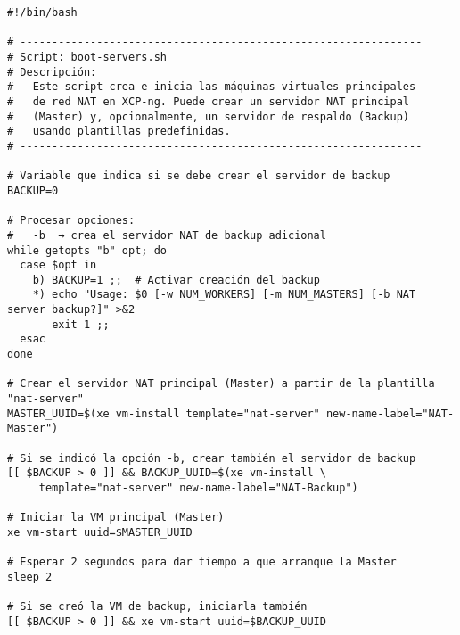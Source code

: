 \begin{verbatim}
#!/bin/bash

# ---------------------------------------------------------------
# Script: boot-servers.sh
# Descripción:
#   Este script crea e inicia las máquinas virtuales principales 
#   de red NAT en XCP-ng. Puede crear un servidor NAT principal 
#   (Master) y, opcionalmente, un servidor de respaldo (Backup) 
#   usando plantillas predefinidas.
# ---------------------------------------------------------------

# Variable que indica si se debe crear el servidor de backup
BACKUP=0

# Procesar opciones:
#   -b  → crea el servidor NAT de backup adicional
while getopts "b" opt; do
  case $opt in
    b) BACKUP=1 ;;  # Activar creación del backup
    *) echo "Usage: $0 [-w NUM_WORKERS] [-m NUM_MASTERS] [-b NAT server backup?]" >&2
       exit 1 ;;
  esac
done

# Crear el servidor NAT principal (Master) a partir de la plantilla "nat-server"
MASTER_UUID=$(xe vm-install template="nat-server" new-name-label="NAT-Master")

# Si se indicó la opción -b, crear también el servidor de backup
[[ $BACKUP > 0 ]] && BACKUP_UUID=$(xe vm-install \
     template="nat-server" new-name-label="NAT-Backup")

# Iniciar la VM principal (Master)
xe vm-start uuid=$MASTER_UUID

# Esperar 2 segundos para dar tiempo a que arranque la Master
sleep 2

# Si se creó la VM de backup, iniciarla también
[[ $BACKUP > 0 ]] && xe vm-start uuid=$BACKUP_UUID
\end{verbatim}